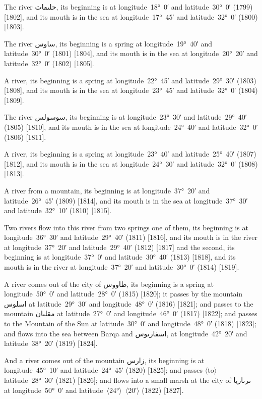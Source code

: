 \documentclass[11pt]{article}
\newcommand{\Pg}[1]{\marginpar{\footnotesize #1}}
\newcommand{\Ang}[1]{\ensuremath{#1}}
\begin{document}
The river \textarabic{حلٮڡاث}, its beginning is at longitude~18°~0′ and latitude~30°~0′ (1799) [1802], and its mouth is in the sea at longitude~17°~45′ and latitude~32°~0′ (1800) [1803].

The river \textarabic{ساوس}, its beginning is a spring at longitude~19°~40′ and latitude~30°~0′ (1801) [1804], and its mouth is in the sea at longitude~20°~20′ and latitude~32°~0′ (1802) [1805].

A river, its beginning is a spring at longitude~22°~45′ and latitude~29°~30′ (1803) [1808], and its mouth is in the sea at longitude~23°~45′ and latitude~32°~0′ (1804) [1809].

The river \textarabic{سوسولس}, its beginning is at longitude~23°~30′ and latitude~29°~40′ (1805) [1810], and its mouth is in the sea at longitude~24°~40′ and latitude~32°~0′ (1806) [1811].

A river, its beginning is a spring at longitude~23°~40′ and latitude~25°~40′ (1807) [1812], and its mouth is in the sea at longitude~24°~30′ and latitude~32°~0′ (1808) [1813].

\Pg{p. 120}A river from a mountain, its beginning is at longitude~37°~20′ and latitude~26°~45′ (1809) [1814], and its mouth is in the sea at longitude~37°~30′ and latitude~32°~10′ (1810) [1815].

Two rivers flow into this river from two springs one of them, its beginning is at longitude~36°~30′ and latitude~29°~40′ (1811) [1816], and its mouth is in the river at longitude~37°~20′ and latitude~29°~40′ (1812) [1817] and the second, its beginning is at longitude~37°~0′ and latitude~30°~40′ (1813) [1818], and its mouth is in the river at longitude~37°~20′ and latitude~30°~0′ (1814) [1819].

A river comes out of the city of \textarabic{طاووس}, its beginning is a spring at longitude~50°~0′ and latitude~28°~0′ (1815) [1820]; it passes by the mountain \textarabic{اسلوس} at latitude~29°~30′ and longitude~48°~0′ (1816) [1821]; and passes to the mountain \textarabic{مقلٮان} at latitude~27°~0′ and longitude~46°~0′ (1817) [1822]; and passes to the Mountain of the Sun at latitude~30°~0′ and longitude~48°~0′ (1818) [1823]; and flows into the sea between Barqa and \textarabic{اسفارٮوس}, at longitude~42°~20′ and latitude~38°~20′ (1819) [1824].

And a river comes out of the mountain \textarabic{زارس}, its beginning is at longitude~45°~10′ and latitude~24°~45′ (1820) [1825]; and passes \Ang{\langle}to\Ang{\rangle} latitude~28°~30′ (1821) [1826]; and flows into a small marsh at the city of \textarabic{ٮرٮاريا} at longitude~50°~0′ and latitude~\Ang{\langle}24°\Ang{\rangle}~\Ang{\langle}20′\Ang{\rangle} (1822) [1827].
\end{document}
